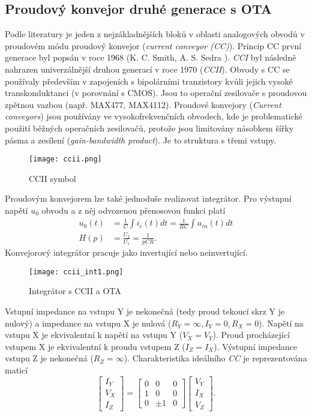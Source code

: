 \subsection{Proudový konvejor druhé generace s OTA}
Podle literatury \cite{15} je jeden z nejzákladnějších bloků v oblasti analogových obvodů v proudovém módu proudový konvejor (\textit{current conveyor (CC)}). Princip CC první generace byl popsán v roce 1968 (K. C. Smith, A. S. Sedra \cite{13}). \textit{CCI} byl následně nahrazen univerzálnější druhou generací v roce 1970 (\textit{CCII})\cite{14}. Obvody s CC se používaly především v zapojeních s bipolárními tranzistory kvůli jejich vysoké transkonduktanci (v porovnání s CMOS). Jsou to operační zesilovače s proudovou zpětnou vazbou (např. MAX477, MAX4112). Proudové konvejory (\textit{Current conveyors}) jsou používány ve vysokofrekvenčních obvodech, kde je problematické použití běžných operačních zesilovačů, protože jsou limitovány násobkem šířky pásma a zesílení (\textit{gain-bandwidth product}). Je to struktura s třemi vstupy.
\begin{figure}[h]
\centering
\texttt{[image: ccii.png]}
\caption[CCII symbol]{CCII symbol \cite{15}}
\end{figure}
\noindent Proudovým konvejorem lze také jednoduše realizovat integrátor. Pro výstupní napětí $u_0$ obvodu a z něj odvozenou přenosovou funkci platí
\begin{align}
u_0(t) &= \frac{1}{C}\int i_c(t)dt = \frac{1}{RC}\int u_{in}(t)dt \\
H(p) &= \frac{U_2}{U_1} = \frac{1}{pCR}.
\end{align}
\noindent Konvejorový integrátor pracuje jako invertující nebo neinvertující.
\begin{figure}[h]
\centering
\texttt{[image: ccii\_int1.png]}
\caption[Integrátor s CCII a OTA]{Integrátor s CCII a OTA \cite{10}}
\end{figure}
\noindent Vstupní impedance na vstupu Y je nekonečná (tedy proud tekoucí skrz Y je nulový) a impedance na vstupu X je nulová ($R_Y = \infty, I_Y = 0, R_X = 0$). Napětí na vstupu X je ekvivalentní k napětí na vstupu Y ($V_X = V_Y$). Proud procházející vstupem X je ekvivalentní k proudu vstupem Z ($I_Z = I_X$). Výstupní impedance vstupu Z je nekonečná ($R_Z = \infty$).
Charakteristika ideálního \textit{CC} je reprezentována maticí
\begin{equation}
\begin{bmatrix}
I_Y \\ V_X \\ I_Z
\end{bmatrix}
=
\begin{bmatrix}
0 & 0 & 0 \\
1 & 0 & 0 \\
0 & \pm 1 & 0 
\end{bmatrix}
\begin{bmatrix}
V_Y \\
I_X \\
V_Z
\end{bmatrix}.
\end{equation}
